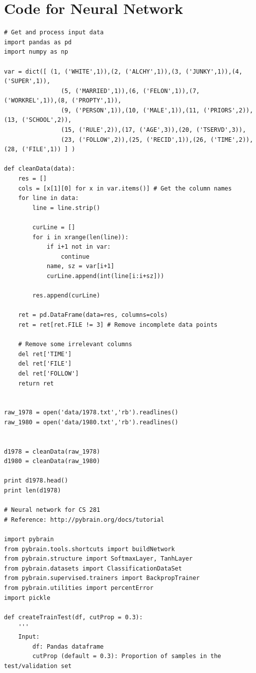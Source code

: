 \documentclass[a4paper]{article}
\theoremstyle{plain}
\begin{document}
\section{Code for Neural Network}
\begin{verbatim}
# Get and process input data
import pandas as pd
import numpy as np

var = dict([ (1, ('WHITE',1)),(2, ('ALCHY',1)),(3, ('JUNKY',1)),(4, ('SUPER',1)),
                (5, ('MARRIED',1)),(6, ('FELON',1)),(7, ('WORKREL',1)),(8, ('PROPTY',1)),
                (9, ('PERSON',1)),(10, ('MALE',1)),(11, ('PRIORS',2)),(13, ('SCHOOL',2)),
                (15, ('RULE',2)),(17, ('AGE',3)),(20, ('TSERVD',3)),
                (23, ('FOLLOW',2)),(25, ('RECID',1)),(26, ('TIME',2)),(28, ('FILE',1)) ] )

def cleanData(data):
    res = []
    cols = [x[1][0] for x in var.items()] # Get the column names
    for line in data:
        line = line.strip()
        
        curLine = []
        for i in xrange(len(line)):
            if i+1 not in var:
                continue
            name, sz = var[i+1]            
            curLine.append(int(line[i:i+sz]))
        
        res.append(curLine)
    
    ret = pd.DataFrame(data=res, columns=cols)
    ret = ret[ret.FILE != 3] # Remove incomplete data points
    
    # Remove some irrelevant columns
    del ret['TIME']
    del ret['FILE']
    del ret['FOLLOW']
    return ret
    

raw_1978 = open('data/1978.txt','rb').readlines()
raw_1980 = open('data/1980.txt','rb').readlines()


d1978 = cleanData(raw_1978)
d1980 = cleanData(raw_1980)

print d1978.head()
print len(d1978)

# Neural network for CS 281
# Reference: http://pybrain.org/docs/tutorial

import pybrain
from pybrain.tools.shortcuts import buildNetwork
from pybrain.structure import SoftmaxLayer, TanhLayer
from pybrain.datasets import ClassificationDataSet
from pybrain.supervised.trainers import BackpropTrainer
from pybrain.utilities import percentError
import pickle

def createTrainTest(df, cutProp = 0.3):
    '''
    Input:
        df: Pandas dataframe
        cutProp (default = 0.3): Proportion of samples in the test/validation set
    

\end{verbatim}
\end{document}
